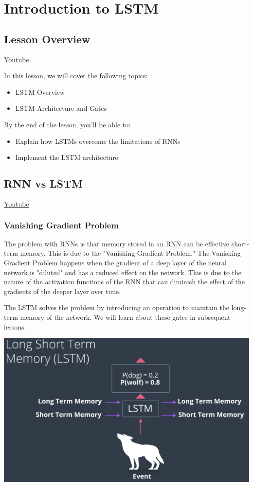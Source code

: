 \chapter{Introduction to LSTM}

\section{Lesson Overview}
\href{https://www.youtube.com/watch?v=CH9O_fNGR2Q&ab_channel=Udacity}{Youtube} \newline

In this lesson, we will cover the following topics:

\begin{itemize}
    \item LSTM Overview
    \item LSTM Architecture and Gates
\end{itemize}
By the end of the lesson, you'll be able to:

\begin{itemize}
    \item Explain how LSTMs overcome the limitations of RNNs
    \item Implement the LSTM architecture
\end{itemize}

\section{RNN vs LSTM}
\href{https://www.youtube.com/watch?v=70MgF-IwAr8&ab_channel=Udacity}{Youtube}
\subsection{Vanishing Gradient Problem}
The problem with RNNs is that memory stored in an RNN can be effective short-term memory. This is due to the "Vanishing Gradient Problem." The Vanishing Gradient Problem happens when the gradient of a deep layer of the neural network is "diluted" and has a reduced effect on the network. This is due to the nature of the activation functions of the RNN that can diminish the effect of the gradients of the deeper layer over time. \newline

The LSTM solves the problem by introducing an operation to maintain the long-term memory of the network. We will learn about these gates in subsequent lessons.

\includegraphics[width=1\linewidth]{img//rnn//lstm/longsthirttermmemory.png}

